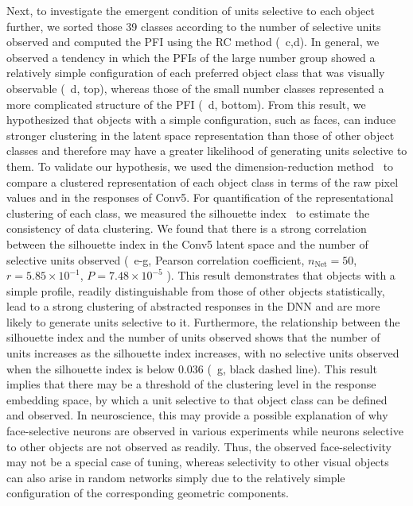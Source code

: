 \documentclass[sn-mathphys]{sn-jnl}%
\theoremstyle{thmstyleone}%
\theoremstyle{thmstyletwo}%
\theoremstyle{thmstylethree}%
\begin{document}
Next, to investigate the emergent condition of units selective to each object further, we sorted those 39 classes according to the number of selective units observed and computed the PFI using the RC method (~c,d).
In general, we observed a tendency in which the PFIs of the large number group showed a relatively simple configuration of each preferred object class that was visually observable (~d, top), 
whereas those of the small number classes represented a more complicated structure of the PFI (~d, bottom).
From this result, we hypothesized that objects with a simple configuration, such as faces, can induce stronger clustering in the latent space representation than those of other object classes and therefore may have a greater likelihood of generating units selective to them.
To validate our hypothesis, we used the dimension-reduction method~\cite{wold1987principal} to compare a clustered representation of each object class in terms of the raw pixel values and in the responses of Conv5.
For quantification of the representational clustering of each class, we measured the silhouette index~\cite{kaufman2009finding} to estimate the consistency of data clustering.
We found that there is a strong correlation between the silhouette index in the Conv5 latent space and the number of selective units observed
(~e-g, Pearson correlation coefficient,
$ n_\textrm{Net} = 50 $,
$ r = 5.85 \times 10^{-1} $,
$ P = 7.48 \times 10^{-5} $
).
This result demonstrates that objects with a simple profile, readily distinguishable from those of other objects statistically, lead to a strong clustering of abstracted responses in the DNN and are more likely to generate units selective to it.
Furthermore, the relationship between the silhouette index and the number of units observed shows that the number of units increases as the silhouette index increases,
with no selective units observed when the silhouette index is below 0.036 (~g, black dashed line).
This result implies that there may be a threshold of the clustering level in the response embedding space, by which a unit selective to that object class can be defined and observed.
In neuroscience, this may provide a possible explanation of why face-selective neurons are observed in various experiments while neurons selective to other objects are not observed as readily.
Thus, the observed face-selectivity may not be a special case of tuning, 
whereas selectivity to other visual objects can also arise in random networks simply due to the relatively simple configuration of the corresponding geometric components.
\end{document}
